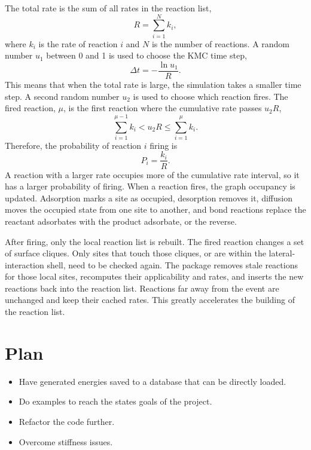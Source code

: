 The total rate is the sum of all rates in the reaction list,
\begin{equation}
    R = \sum_{i=1}^{N} k_i ,
\end{equation}
where $k_i$ is the rate of reaction $i$ and $N$ is the number of reactions.
A random number $u_1$ between 0 and 1 is used to choose the KMC time step,
\begin{equation}
    \Delta t = -\frac{\ln u_1}{R}.
\end{equation}
This means that when the total rate is large, the simulation takes a smaller time step.
A second random number $u_2$ is used to choose which reaction fires.
The fired reaction, $\mu$, is the first reaction where the cumulative rate passes $u_2R$,
\begin{equation}
    \sum_{i=1}^{\mu-1} k_i < u_2R \leq \sum_{i=1}^{\mu} k_i .
\end{equation}
Therefore, the probability of reaction $i$ firing is
\begin{equation}
    P_i = \frac{k_i}{R}.
\end{equation}
A reaction with a larger rate occupies more of the cumulative rate interval, so it has a larger probability of firing.
When a reaction fires, the graph occupancy is updated.
Adsorption marks a site as occupied, desorption removes it, diffusion moves the occupied state from one site to another, and bond reactions replace the reactant adsorbates with the product adsorbate, or the reverse.

After firing, only the local reaction list is rebuilt.
The fired reaction changes a set of surface cliques.
Only sites that touch those cliques, or are within the lateral-interaction shell, need to be checked again.
The package removes stale reactions for those local sites, recomputes their applicability and rates, and inserts the new reactions back into the reaction list.
Reactions far away from the event are unchanged and keep their cached rates.
This greatly accelerates the building of the reaction list.

%
\section{Plan}
\noindent
\begin{itemize}
    \item Have generated energies saved to a database that can be directly loaded.
    \item Do examples to reach the states goals of the project.
    \item Refactor the code further.
    \item Overcome stiffness issues.
\end{itemize}
